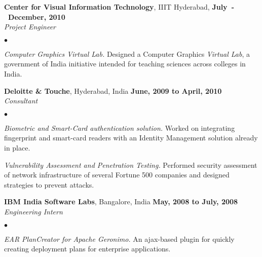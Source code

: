 \documentclass[margin,line]{res}
\newenvironment{list2}{
  \begin{list}{$\bullet$}{%
      \setlength{\itemsep}{0in}
      \setlength{\parsep}{0in} \setlength{\parskip}{0in}
      \setlength{\topsep}{0in} \setlength{\partopsep}{0in} 
      \setlength{\leftmargin}{0.2in}}}{\end{list}}
\begin{document}
\begin{resume}
{\bf Center for Visual Information Technology}, IIIT Hyderabad, \hfill {\bf July~-~December, 2010}\\
{\em Project Engineer}\par
\begin{list2}
\item {\em Computer Graphics Virtual Lab.} Designed a Computer Graphics {\em Virtual Lab}, a government of India initiative intended for teaching sciences across colleges in India.
\end{list2}

{\bf Deloitte \& Touche}, Hyderabad, India \hfill {\bf June, 2009 to April, 2010}\\
{\em Consultant}\par
\begin{list2}
\item {\em Biometric and Smart-Card authentication solution.} Worked on integrating fingerprint
and smart-card readers with an Identity Management solution already in place.
\item {\em Vulnerability Assessment and Penetration Testing.} Performed security assessment
of network infrastructure of several Fortune 500 companies and designed strategies to prevent attacks.
\end{list2}

{\bf IBM India Software Labs}, Bangalore, India \hfill {\bf May, 2008 to July, 2008}\\
{\em Engineering Intern}\par
\begin{list2}
\item {\em EAR PlanCreator for Apache Geronimo.} An ajax-based plugin for quickly creating deployment plans for enterprise applications.
\end{list2}


\end{resume}
\end{document}
